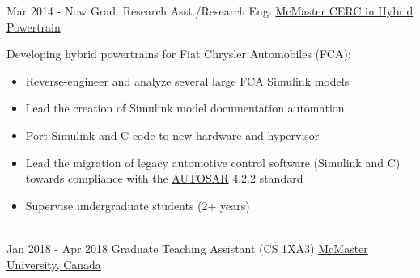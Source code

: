 \documentclass[letterpaper]{twentysecondcv} %
\begin{document}
\vspace{-.5em}
\begin{twenty} %
  \twentyitem
  {Mar 2014 -}
  {Now}
  {Grad. Research Asst./Research Eng.}
  {%
    \href{http://hybrid.mcmaster.ca/}{McMaster CERC in Hybrid Powertrain}}
  {}
  {Developing hybrid powertrains for Fiat Chrysler Automobiles (FCA):
    \begin{itemize}
      \item Reverse-engineer and analyze several large FCA Simulink models
      \item Lead the creation of Simulink model documentation automation
      \item Port Simulink and C code to new hardware and hypervisor
      \item Lead the migration of legacy automotive control software (Simulink and C) towards compliance with the \href{https://www.autosar.org/standards/classic-platform/}{AUTOSAR} 4.2.2 standard
      \item Supervise undergraduate students (2+ years)
    \end{itemize}}
	\\
  \twentyitem
  {Jan 2018 -}
  {Apr 2018}
  {Graduate Teaching Assistant (CS 1XA3)}
  {\href{https://www.mcmaster.ca/}{McMaster University, Canada}}

\end{twenty}
\end{document}
